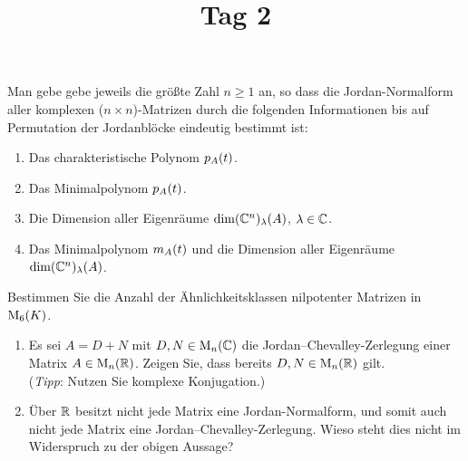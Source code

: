 \documentclass[a4paper, 10pt]{scrartcl}
\title{Tag 2}
\author{}
\date{}
\begin{document}
\begin{question}[subtitle = Bestimmtheit der Jordan-Normalform]
  Man gebe gebe jeweils die größte Zahl $n \geq 1$ an, so dass die Jordan-Normalform aller komplexen ($n \times n$)-Matrizen durch die folgenden Informationen bis auf Permutation der Jordanblöcke eindeutig bestimmt ist:
  \begin{enumerate}
    \item
      Das charakteristische Polynom $p_{A}(t)$.
    \item
      Das Minimalpolynom $p_{A}(t)$.
    \item
      Die Dimension aller Eigenräume $\dim (\mathbb{C}^n)_{\lambda}(A)$, $\lambda \in \mathbb{C}$.
    \item
      Das Minimalpolynom $m_{A}(t)$ und die Dimension aller Eigenräume $\dim (\mathbb{C}^n)_{\lambda}(A)$.
  \end{enumerate}
\end{question}










\begin{question}[subtitle = Ähnlichkeitsklassen nilpotenter Matrizen]
  Bestimmen Sie die Anzahl der Ähnlichkeitsklassen nilpotenter Matrizen in $\operatorname{M}_{6}(K)$.
\end{question}





\begin{question}[subtitle = Jordan--Chevalley-Zerlegung reeller Matrizen]
  \begin{enumerate}
    \item
      Es sei $A = D + N$ mit $D, N \in \operatorname{M}_{n}(\mathbb{C})$ die Jordan--Chevalley-Zerlegung einer Matrix $A \in \operatorname{M}_{n}(\mathbb{R})$.
      Zeigen Sie, dass bereits $D, N \in \operatorname{M}_{n}(\mathbb{R})$ gilt.
      \\
      (\emph{Tipp}:
       Nutzen Sie komplexe Konjugation.)
    \item
      Über $\mathbb{R}$ besitzt nicht jede Matrix eine Jordan-Normalform, und somit auch nicht jede Matrix eine Jordan--Chevalley-Zerlegung.
      Wieso steht dies nicht im Widerspruch zu der obigen Aussage?
  \end{enumerate}
\end{question}
\end{document}
